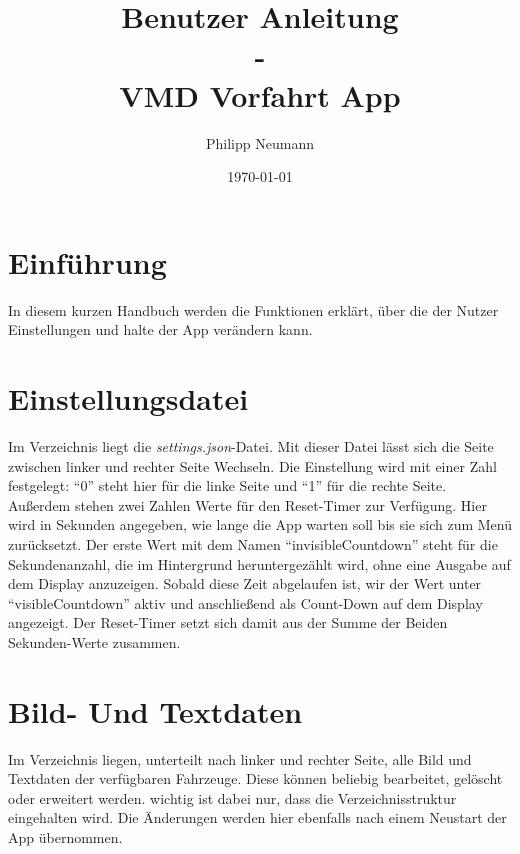 \documentclass[a4paper,12pt]{scrarticle}
\title{Benutzer Anleitung\\
	   -\\
   	   VMD Vorfahrt App}
\author{Philipp Neumann}
\date{\today}
\begin{document}
%
\maketitle
%
%
\section{Einführung}
\label{chap:intro}
In diesem kurzen Handbuch werden die Funktionen erklärt, über die der Nutzer Einstellungen und halte der App verändern kann. 
%
\section{Einstellungsdatei}
\label{sec:setttings}
%
Im Verzeichnis  liegt die \emph{settings.json}-Datei. Mit dieser Datei lässt sich die Seite zwischen linker und rechter Seite Wechseln. Die Einstellung wird mit einer Zahl festgelegt: \enquote{0} steht hier für die linke Seite und \enquote{1} für die rechte Seite.\\
Außerdem stehen zwei Zahlen Werte für den Reset-Timer zur Verfügung. Hier wird in Sekunden angegeben, wie lange die App warten soll bis sie sich zum Menü zurücksetzt. Der erste Wert mit dem Namen \enquote{invisibleCountdown} steht für die Sekundenanzahl, die im Hintergrund heruntergezählt wird, ohne eine Ausgabe auf dem Display anzuzeigen. Sobald diese Zeit abgelaufen ist, wir der Wert unter \enquote{visibleCountdown} aktiv und anschließend als Count-Down auf dem Display angezeigt. Der Reset-Timer setzt sich damit aus der Summe der Beiden Sekunden-Werte zusammen.
%
\section{Bild- Und Textdaten}
\label{sec:content}
%
Im Verzeichnis  liegen, unterteilt nach linker und rechter Seite, alle Bild und Textdaten der verfügbaren Fahrzeuge. Diese können beliebig bearbeitet, gelöscht oder erweitert werden. wichtig ist dabei nur, dass die Verzeichnisstruktur eingehalten wird. Die Änderungen werden hier ebenfalls nach einem Neustart der App übernommen.
%
\end{document}

